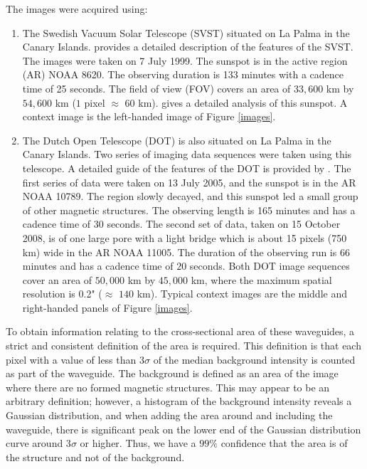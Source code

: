 	The images were acquired using:

	\begin{enumerate}
		\item 
			The Swedish Vacuum Solar Telescope (SVST) situated on La Palma in the Canary Islands.
			\citet{scharmer} provides a detailed description of the features of the SVST.
			The images were taken on 7 July 1999.
			The sunspot is in the active region (AR) NOAA 8620.
			The observing duration is 133 minutes with a cadence time of 25 seconds.
			The field of view (FOV) covers an area of $33,600$ km by $54,600$ km ($1$ pixel $\approx$ $60$ km). \citet{bonet} gives a detailed analysis of this sunspot.
			A context image is the left-handed image of Figure \ref{images}.
		\item 
			The Dutch Open Telescope (DOT) is also situated on La Palma in the Canary Islands.
			Two series of imaging data sequences were taken using this telescope.
			A detailed guide of the features of the DOT is  provided by \citet{rutten}.
			The first series of data were taken on 13 July 2005, and the sunspot is in the AR NOAA 10789.
			The region slowly decayed, and this sunspot led a small group of other magnetic structures.
			The observing length is 165 minutes and has a cadence time of $30$ seconds.
			The second set of data, taken on 15 October 2008, is of one large pore with a light bridge which is about 15 pixels (750 km) wide in the AR NOAA 11005.
			The duration of the observing run is 66 minutes and has a cadence time of $20$ seconds.
			Both DOT image sequences cover an area of $50,000$ km by $45,000$ km, where the maximum spatial resolution is 0.2" ($\approx$ $140$ km).
			Typical context images are the middle and right-handed panels of Figure \ref{images}.
   \end{enumerate}
   
	To obtain information relating to the cross-sectional area of these waveguides, a strict and consistent definition of the area is required.
	This definition is that each pixel with a value of less than $3\sigma$ of the median background intensity is counted as part of the waveguide.
	The background is defined as an area of the image where there are no formed magnetic structures.
	This may appear to be an arbitrary definition; however, a histogram of the background intensity reveals a Gaussian distribution, and when adding the area around and including the waveguide, there is significant peak on the lower end of the Gaussian distribution curve around 3$\sigma$ or higher.
	Thus, we have a $99\%$ confidence that the area is of the structure and not of the background.
	
